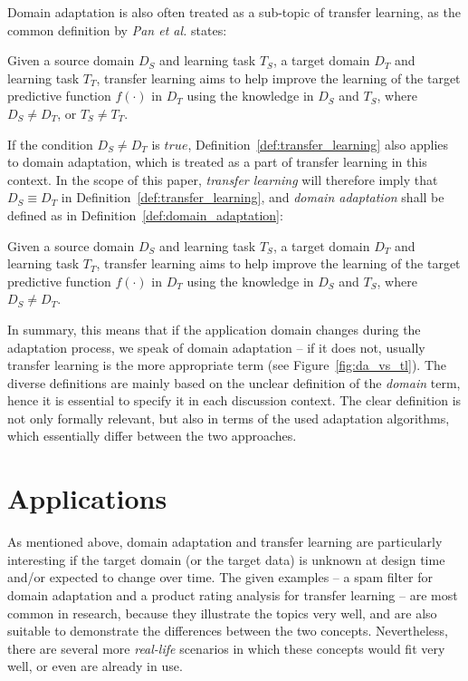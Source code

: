 Domain adaptation is also often treated as a sub-topic of transfer learning, as the common definition by \textit{Pan et al.} states: \cite{Pan2010}

\begin{definition}\label{def:transfer_learning}
Given a source domain $D_{S}$ and learning task $T_{S}$, a target domain $D_{T}$ and learning task $T_{T}$, transfer learning aims to help improve the learning of the
target predictive function $f(\cdot)$ in $D_{T}$ using the knowledge in $D_{S}$ and $T_{S}$, where $D_{S} \neq D_{T}$, or $T_{S} \neq T_{T}$.
\end{definition}

If the condition $D_{S} \neq D_{T}$ is $true$, Definition~\ref{def:transfer_learning} also applies to domain adaptation, which is treated as a part of transfer learning in this context. In the scope of this paper, \textit{transfer learning} will therefore imply that $D_{S} \equiv D_{T}$ in Definition~\ref{def:transfer_learning}, and \textit{domain adaptation} shall be defined as in Definition~\ref{def:domain_adaptation}:
\newpage
\begin{definition}\label{def:domain_adaptation}
Given a source domain $D_{S}$ and learning task $T_{S}$, a target domain $D_{T}$ and learning task $T_{T}$, transfer learning aims to help improve the learning of the
target predictive function $f(\cdot)$ in $D_{T}$ using the knowledge in $D_{S}$ and $T_{S}$, where $D_{S} \neq D_{T}$.
\end{definition}

In summary, this means that if the application domain changes during the adaptation process, we speak of domain adaptation -- if it does not, usually transfer learning is the more appropriate term (see Figure~\ref{fig:da_vs_tl}). The diverse definitions are mainly based on the unclear definition of the \textit{domain} term, hence it is essential to specify it in each discussion context. The clear definition is not only formally relevant, but also in terms of the used adaptation algorithms, which essentially differ between the two approaches. \cite{Patricia2014}

\section{Applications}
As mentioned above, domain adaptation and transfer learning are particularly interesting if the target domain (or the target data) is unknown at design time and/or expected to change over time. The given examples -- a spam filter for domain adaptation and a product rating analysis for transfer learning -- are most common in research, because they illustrate the topics very well, and are also suitable to demonstrate the differences between the two concepts. Nevertheless, there are several more \textit{real-life} scenarios in which these concepts would fit very well, or even are already in use.

